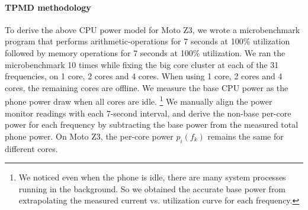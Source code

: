 \paragraph{TPMD methodology}
To derive the above CPU power model for Moto Z3,
we wrote a microbenchmark program that performs arithmetic-operations for 7 seconds at 100\% utilization followed by memory operations for 7 seconds at 100\% utilization. 
We ran the microbenchmark 10 times while fixing the big core cluster at each of the 31 frequencies, 
on 1 core, 2 cores and 4 cores.
When using 1 core, 2 cores and 4 cores, the remaining cores are offline.
We measure the base CPU power as the phone power draw when all cores are idle.
\footnote{We noticed even when the phone is idle, there are many system processes running in the background.
% 
So we obtained the accurate
base power from extrapolating the measured current vs. utilization curve for each frequency.}
We manually align the power monitor readings with each 7-second interval, 
and derive the non-base per-core power for each frequency by 
subtracting the base power from the measured total phone power.
{On Moto Z3, the per-core power $p_i(f_k)$ remains the same for different cores.}





